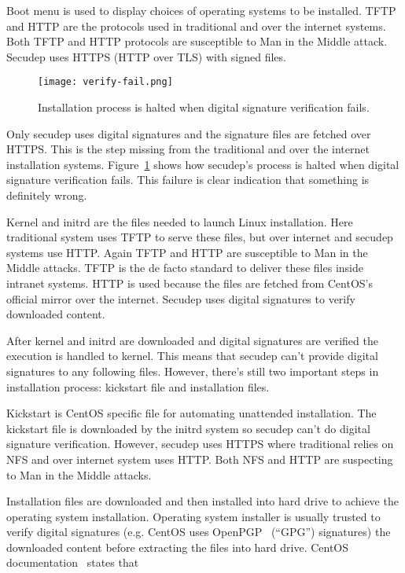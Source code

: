 Boot menu is used to display choices of operating systems to be
installed. TFTP and HTTP are the protocols used in traditional and
over the internet systems. Both TFTP and HTTP protocols are
susceptible to Man in the Middle attack. Secudep uses HTTPS (HTTP over
TLS) with signed files.

\begin{figure}[h]
  \texttt{[image: verify-fail.png]}
  \caption{Installation process is halted when digital signature
    verification fails.}
  \label{fig:verify-fail}
\end{figure}

Only secudep uses digital signatures and the signature files are
fetched over HTTPS. This is the step missing from the traditional and
over the internet installation systems. Figure~\ref{fig:verify-fail}
shows how secudep's process is halted when digital signature
verification fails. This failure is clear indication that something is
definitely wrong.

Kernel and initrd are the files needed to launch Linux
installation. Here traditional system uses TFTP to serve these files,
but over internet and secudep systems use HTTP. Again TFTP and HTTP
are susceptible to Man in the Middle attacks. TFTP is the de facto
standard to deliver these files inside intranet systems. HTTP is used
because the files are fetched from CentOS's official mirror over the
internet. Secudep uses digital signatures to verify downloaded content.

After kernel and initrd are downloaded and digital signatures are
verified the execution is handled to kernel. This means that secudep
can't provide digital signatures to any following files. However, there's
still two important steps in installation process: kickstart file and
installation files.

Kickstart is CentOS specific file for automating unattended
installation. The kickstart file is downloaded by the initrd system so
secudep can't do digital signature verification. However, secudep uses
HTTPS where traditional relies on NFS and over internet system uses
HTTP. Both NFS and HTTP are suspecting to Man in the Middle attacks.

Installation files are downloaded and then installed into hard drive
to achieve the operating system installation. Operating system
installer is usually trusted to verify digital signatures (e.g. CentOS
uses OpenPGP~\cite{RFC4880} (``GPG'') signatures) the downloaded content before
extracting the files into hard drive. CentOS
documentation~\cite{centos-gpg} states that

